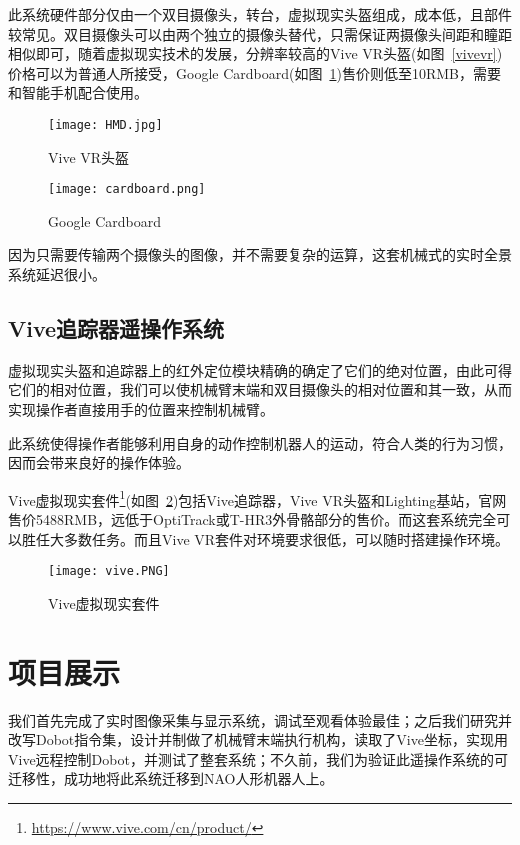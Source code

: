 此系统硬件部分仅由一个双目摄像头，转台，虚拟现实头盔组成，成本低，且部件较常见。双目摄像头可以由两个独立的摄像头替代，只需保证两摄像头间距和瞳距相似即可，随着虚拟现实技术的发展，分辨率较高的Vive VR头盔(如图~\ref{vivevr})价格可以为普通人所接受，Google Cardboard(如图~\ref{cardb})售价则低至10RMB，需要和智能手机配合使用。
\begin{figure}
\begin{minipage}{0.48\textwidth}
  \centering
  \texttt{[image: HMD.jpg]}
  \caption{Vive VR头盔}
  \label{vivevr}
\end{minipage}\hfill
\begin{minipage}{0.48\textwidth}
  \centering
  \texttt{[image: cardboard.png]}
  \caption{Google Cardboard}
  \label{cardb}
\end{minipage}
\end{figure}

因为只需要传输两个摄像头的图像，并不需要复杂的运算，这套机械式的实时全景系统延迟很小。

\section{Vive追踪器遥操作系统}

虚拟现实头盔和追踪器上的红外定位模块精确的确定了它们的绝对位置，由此可得它们的相对位置，我们可以使机械臂末端和双目摄像头的相对位置和其一致，从而实现操作者直接用手的位置来控制机械臂。

此系统使得操作者能够利用自身的动作控制机器人的运动，符合人类的行为习惯，因而会带来良好的操作体验。

Vive虚拟现实套件\footnote{\url{https://www.vive.com/cn/product/}}(如图~\ref{vivekit})包括Vive追踪器，Vive VR头盔和Lighting基站，官网售价5488RMB，远低于OptiTrack或T-HR3外骨骼部分的售价。而这套系统完全可以胜任大多数任务。而且Vive VR套件对环境要求很低，可以随时搭建操作环境。
\begin{figure}[H]
\small
\centering
\texttt{[image: vive.PNG]}
\caption{Vive虚拟现实套件} 
\label{vivekit}
\end{figure}

\chapter{项目展示}

我们首先完成了实时图像采集与显示系统，调试至观看体验最佳；之后我们研究并改写Dobot指令集，设计并制做了机械臂末端执行机构，读取了Vive坐标，实现用Vive远程控制Dobot，并测试了整套系统；不久前，我们为验证此遥操作系统的可迁移性，成功地将此系统迁移到NAO人形机器人上。

